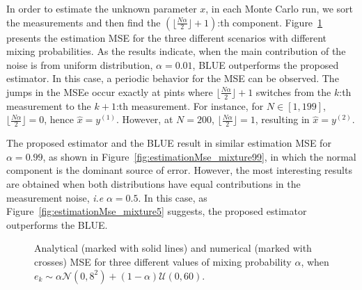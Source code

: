 \documentclass{article}
\begin{document}
In order to estimate the unknown parameter $x$, in each Monte Carlo run, we sort the measurements and then find the $(\lfloor\frac{N\alpha}{2}\rfloor+1)$:th component. Figure~\ref{fig:mixture_order} presents the estimation MSE for the three different scenarios with different mixing probabilities. As the results indicate, when the main contribution of the noise is from uniform distribution, $\alpha=0.01$, BLUE outperforms the proposed estimator.  In this case, a periodic behavior for the MSE can be observed. The jumps in the MSEe occur exactly at pints where $\lfloor\frac{N\alpha}{2}\rfloor+1$ switches from the $k$:th measurement to the $k+1$:th measurement. For instance, for $N\in[1,199]$, $\lfloor\frac{N\alpha}{2}\rfloor=0$, hence $\hat{x}=y^{(1)}$. However, at $N=200$, $\lfloor\frac{N\alpha}{2}\rfloor=1$, resulting in $\hat{x}=y^{(2)}$. 

The proposed estimator and the BLUE result in similar estimation MSE for $\alpha=0.99$, as shown in Figure~\ref{fig:estimationMse_mixture99}, in which the normal component is the dominant source of error. However, the most interesting results are obtained when both distributions have equal contributions in the measurement noise, {\em i.e} $\alpha=0.5$. In this case, as Figure~\ref{fig:estimationMse_mixture5} suggests, the proposed estimator outperforms the BLUE.
%
%
\begin{figure}[]
	\centering
	\hfil
		\hfil
	\caption{Analytical (marked with solid lines) and numerical (marked with crosses) MSE for three different values of mixing probability $\alpha$, when $e_k\sim \alpha\mathcal{N}(0,8^2) + (1-\alpha)\mathcal{U}(0,60)$.}
	\label{fig:mixture_order}
\end{figure}
%
%
\end{document}
